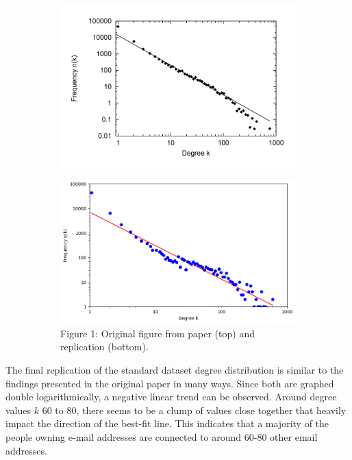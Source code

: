 \documentclass[11pt]{article}
\begin{document}
\begin{multicols}{2}
\begin{figure}[H]
  \centering
  \begin{subfigure}{0.9\linewidth}
    \centering
    \includegraphics[width=\linewidth]{figure1_original.png}
    \label{fig:figure2_original}
  \end{subfigure}
  \begin{subfigure}{0.8\linewidth}
    \centering
    \includegraphics[width=\linewidth]{figure1_replicated.png}
    \label{fig:figure2_replicated}
    \footnotesize{Figure 1: Original figure from paper (top) and replication (bottom).}
  \end{subfigure}
\end{figure}

The final replication of the standard dataset degree distribution is similar to the findings presented in the original paper in many ways. Since both are graphed double logarithmically, a negative linear trend can be observed. Around degree values \(k\) 60 to 80, there seems to be a clump of values close together that heavily impact the direction of the best-fit line. This indicates that a majority of the people owning e-mail addresses are connected to around 60-80 other email addresses. 


\end{multicols}
\end{document}
